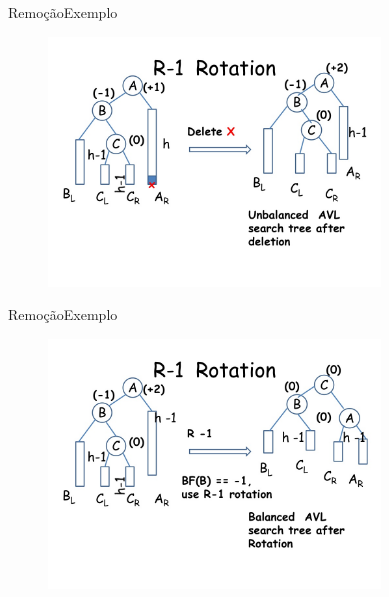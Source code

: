 \documentclass[aspectratio=169]{beamer}
\begin{document}

\begin{frame}{Remoção}{Exemplo}
\begin{figure}[!h]
  \centering
  \includegraphics[width=250pt]{imagens/exemplo_remocao9.png}
  \label{fig_exemplo_remocao9}
\end{figure}
\end{frame}


\begin{frame}{Remoção}{Exemplo}
\begin{figure}[!h]
  \centering
  \includegraphics[width=250pt]{imagens/exemplo_remocao10.png}
  \label{fig_exemplo_remocao10}
\end{figure}
\end{frame}

\end{document}
